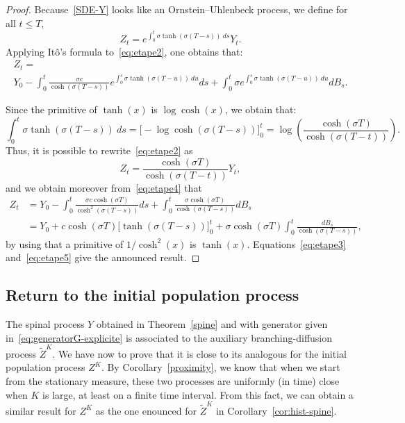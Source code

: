 \documentclass[AHL,Unicode,longabstracts,published]{cedram}
\begin{document}
\begin{proof}
Because~\eqref{SDE-Y} looks like an Ornstein--Uhlenbeck process, we define for all $t\le T$,
\begin{equation}\label{eq:etape2}
Z_{t}=e^{\int_{0}^{t}\sigma \tanh\left(\sigma(T-s)\right)\ ds}Y_{t}.
\end{equation}
Applying It\^o's formula to~\eqref{eq:etape2}, one obtains that:
\begin{multline}\label{eq:etape4}
{Z}_{t}= \\
{Y}_{0} -\int_{0}^{t} \frac{\sigma c}{\cosh\left(\sigma(T-s)\right)} e^{\int_{0}^{s}\sigma \tanh\left(\sigma(T-u)\right)\ du} ds+\int_{0}^{t}\sigma e^{\int_{0}^{s}\sigma \tanh\left(\sigma(T-u)\right)\ du} d B_{s}.
\end{multline}

Since the primitive of $\tanh(x)$ is $\log \cosh (x)$, we obtain that:
\begin{equation}\label{eq:etape1}
\int_{0}^{t}\sigma \tanh(\sigma(T-s))\ ds = \big[-\log \cosh(\sigma(T-s))\big]_0^t = \log \left(\frac{\cosh (\sigma T)}{\cosh (\sigma(T-t))}\right).
\end{equation}
Thus, it is possible to rewrite~\eqref{eq:etape2} as
\begin{equation}\label{eq:etape3}
{Z}_{t} = \frac{\cosh (\sigma T)}{\cosh (\sigma(T-t))} {Y}_t,
\end{equation}
and we obtain moreover from~\eqref{eq:etape4} that
\begin{equation}\label{eq:etape5}
\begin{split}
{Z}_{t} &= {Y}_0 - \int_0^t \frac{\sigma c \cosh(\sigma T)}{\cosh^2(\sigma(T-s))}ds +\int_{0}^{t}\frac{\sigma \cosh(\sigma T)}{\cosh(\sigma(T-s))} dB_{s}\\
&= {Y}_0 + c \cosh(\sigma T) \big[\tanh(\sigma(T-s))\big]_0^t + \sigma \cosh(\sigma T)\int_{0}^{t}\frac{dB_s}{\cosh(\sigma(T-s))}, 
\end{split}
\end{equation}
by using that a primitive of $1/\cosh^2(x)$ is $\tanh(x)$. Equations~\eqref{eq:etape3} and~\eqref{eq:etape5} give the announced result.
\end{proof}



\subsection{Return to the initial population process}

The spinal process $Y$ obtained in Theorem~\ref{spine} and with generator given in~\eqref{eq:generatorG-explicite} is associated to the auxiliary branching-diffusion process $\widetilde Z^K$. We have now to prove that it is close to its analogous for the initial population process $Z^K$. By Corollary~\ref{proximity}, we know that when we start from the stationary measure, these two processes are uniformly (in time) close when $K$ is large, at least on a finite time interval. From this fact, we can obtain a similar result for $Z^K$ as the one enounced for $\widetilde{Z}^K$ in Corollary~\ref{cor:hist-spine}.
\end{document}
